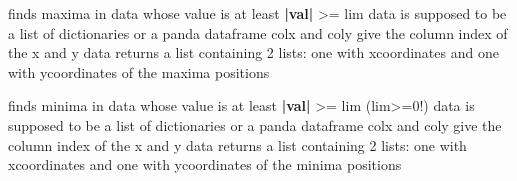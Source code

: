 \documentclass[letterpaper,10pt,english]{sphinxmanual}
\begin{document}

\begin{fulllineitems}
\label{\detokenize{autoapi/unduwave/helpers/bfield_helpers/index:unduwave.helpers.bfield_helpers.find_maxima}}
\pysigstartsignatures
{}
\pysigstopsignatures
\sphinxAtStartPar
finds maxima in data whose value is at least {\color{red}\bfseries{}|val|} \textgreater{}= lim
data is supposed to be a list of dictionaries or a panda dataframe
colx and coly give the column index of the x and y data
returns a list containing 2 lists: one with x\sphinxhyphen{}coordinates and one
with y\sphinxhyphen{}coordinates of the maxima positions

\end{fulllineitems}


\begin{fulllineitems}
\label{\detokenize{autoapi/unduwave/helpers/bfield_helpers/index:unduwave.helpers.bfield_helpers.find_minima}}
\pysigstartsignatures
{}
\pysigstopsignatures
\sphinxAtStartPar
finds minima in data whose value is at least {\color{red}\bfseries{}|val|} \textgreater{}= lim (lim\textgreater{}=0!)
data is supposed to be a list of dictionaries or a panda dataframe
colx and coly give the column index of the x and y data
returns a list containing 2 lists: one with x\sphinxhyphen{}coordinates and one
with y\sphinxhyphen{}coordinates of the minima positions

\end{fulllineitems}
\end{document}
